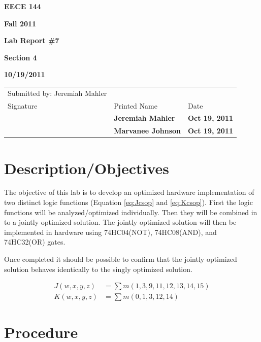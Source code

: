 \documentclass[12pt]{article}
\begin{document}

\centerline{\bf EECE 144}
\centerline{\bf Fall 2011}
\centerline{\bf}
\centerline{\bf Lab Report \#7}
\centerline{\bf Section 4}
\centerline{\bf 10/19/2011}

\begin{center}
\begin{tabularx}{\textwidth}[b]{X l l}
Submitted by: Jeremiah Mahler & & \\
Signature & Printed Name & Date \\
\hline
\multicolumn{1}{|X|}{} & \multicolumn{1}{|l|}{\bigstrut \bf Jeremiah Mahler} & \multicolumn{1}{|l|}{\bf Oct 19, 2011} \\
\hline
\multicolumn{1}{|X|}{} & \multicolumn{1}{|l|}{\bigstrut \bf Marvanee Johnson} & \multicolumn{1}{|l|}{\bf Oct 19, 2011} \\
\hline
\end{tabularx}
\end{center}

\section{Description/Objectives}

The objective of this lab is to develop an optimized hardware
implementation of two distinct logic functions
(Equation \ref{eq:Jcsop} and \ref{eq:Kcsop}).
First the logic functions will be analyzed/optimized individually.
Then they will be combined in to a jointly optimized solution.
The jointly optimized solution will then be implemented in hardware
using 74HC04(NOT), 74HC08(AND), and 74HC32(OR) gates.

Once completed it should be possible to confirm that the jointly
optimized solution behaves identically to the singly optimized solution.

\begin{align}
J(w, x, y, z) &= \sum m(1,3,9,11,12,13,14,15) \label{eq:Jcsop} \\
K(w, x, y, z) &= \sum m(0,1,3,12,14) \label{eq:Kcsop}
\end{align}

\section{Procedure}
\label{sec:procedure}
\end{document}
